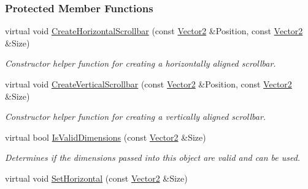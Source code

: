 \subsubsection*{Protected Member Functions}
\begin{DoxyCompactItemize}
\item 
\hypertarget{classphys_1_1UI_1_1Scrollbar_a47fac0a138c92b56f61681799e76cc27}{
virtual void \hyperlink{classphys_1_1UI_1_1Scrollbar_a47fac0a138c92b56f61681799e76cc27}{CreateHorizontalScrollbar} (const \hyperlink{classphys_1_1Vector2}{Vector2} \&Position, const \hyperlink{classphys_1_1Vector2}{Vector2} \&Size)}
\label{d0/d3e/classphys_1_1UI_1_1Scrollbar_a47fac0a138c92b56f61681799e76cc27}

\begin{DoxyCompactList}\small\item\em Constructor helper function for creating a horizontally aligned scrollbar. \item\end{DoxyCompactList}\item 
\hypertarget{classphys_1_1UI_1_1Scrollbar_a7e703aee21212630777f151005498997}{
virtual void \hyperlink{classphys_1_1UI_1_1Scrollbar_a7e703aee21212630777f151005498997}{CreateVerticalScrollbar} (const \hyperlink{classphys_1_1Vector2}{Vector2} \&Position, const \hyperlink{classphys_1_1Vector2}{Vector2} \&Size)}
\label{d0/d3e/classphys_1_1UI_1_1Scrollbar_a7e703aee21212630777f151005498997}

\begin{DoxyCompactList}\small\item\em Constructor helper function for creating a vertically aligned scrollbar. \item\end{DoxyCompactList}\item 
\hypertarget{classphys_1_1UI_1_1Scrollbar_a4953ac8c0b711ed9c1be468897e09ce8}{
virtual bool \hyperlink{classphys_1_1UI_1_1Scrollbar_a4953ac8c0b711ed9c1be468897e09ce8}{IsValidDimensions} (const \hyperlink{classphys_1_1Vector2}{Vector2} \&Size)}
\label{d0/d3e/classphys_1_1UI_1_1Scrollbar_a4953ac8c0b711ed9c1be468897e09ce8}

\begin{DoxyCompactList}\small\item\em Determines if the dimensions passed into this object are valid and can be used. \item\end{DoxyCompactList}\item 
\hypertarget{classphys_1_1UI_1_1Scrollbar_acb5622bfb508d54f7802811e5dda4704}{
virtual void \hyperlink{classphys_1_1UI_1_1Scrollbar_acb5622bfb508d54f7802811e5dda4704}{SetHorizontal} (const \hyperlink{classphys_1_1Vector2}{Vector2} \&Size)}
\label{d0/d3e/classphys_1_1UI_1_1Scrollbar_acb5622bfb508d54f7802811e5dda4704}


\end{DoxyCompactItemize}
